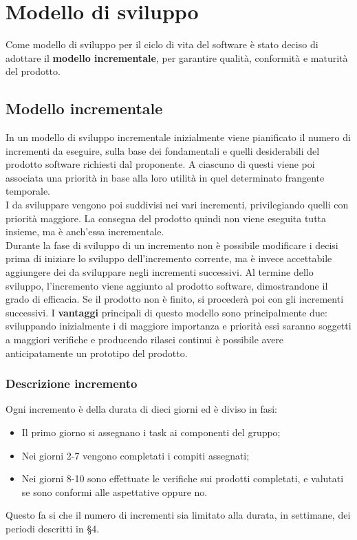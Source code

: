 \documentclass[PianoDiProgetto.tex]{subfiles}
\begin{document}
\chapter{Modello di sviluppo}
Come modello di sviluppo per il ciclo di vita del software è stato deciso di adottare il \textbf{modello incrementale}, per garantire qualità, conformità e maturità del prodotto.

\section{Modello incrementale}
In un modello di sviluppo incrementale inizialmente viene pianificato il numero di incrementi da eseguire, sulla base dei  fondamentali e quelli desiderabili del prodotto software richiesti dal proponente. A ciascuno di questi viene poi associata una priorità in base alla loro utilità in quel determinato frangente temporale.\\
I  da sviluppare vengono poi suddivisi nei vari incrementi, privilegiando quelli con priorità maggiore. La consegna del prodotto quindi non viene eseguita tutta insieme, ma è anch'essa incrementale.\\
Durante la fase di sviluppo di un incremento non è possibile modificare i  decisi prima di iniziare lo sviluppo dell'incremento corrente, ma è invece accettabile aggiungere dei  da sviluppare negli incrementi successivi. Al termine dello sviluppo, l'incremento viene aggiunto al prodotto software, dimostrandone il grado di efficacia. Se il prodotto non è finito, si procederà poi con gli incrementi successivi. I \textbf{vantaggi} principali di questo modello sono principalmente due: sviluppando inizialmente i  di maggiore importanza e priorità essi saranno soggetti a maggiori verifiche e producendo rilasci continui è possibile avere anticipatamente un prototipo del prodotto.

\subsection{Descrizione incremento}
Ogni incremento è della durata di dieci giorni ed è diviso in fasi:
\begin{itemize}
	\item Il primo giorno si assegnano i task ai componenti del gruppo;
	\item Nei giorni 2-7 vengono completati i compiti assegnati;
	\item Nei giorni 8-10 sono effettuate le verifiche sui prodotti completati, e valutati se sono conformi alle aspettative oppure no.
\end{itemize}
Questo fa si che il numero di incrementi sia limitato alla durata, in settimane, dei periodi descritti in \S 4.
\end{document}
